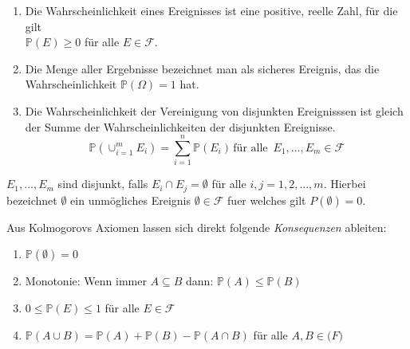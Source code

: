 \begin{Def}

\vspace{5pt}

\begin{enumerate}
	\item Die Wahrscheinlichkeit eines Ereignisses ist eine positive, reelle Zahl, f\"ur die gilt \\ $\mathbb{P} (E) \geq 0$ f\"ur alle $E \in \mathcal{F}$.
	\item Die Menge aller Ergebnisse bezeichnet man als sicheres Ereignis, das die Wahrscheinlichkeit $\mathbb{P} (\Omega) = 1$ hat.
	\item Die Wahrscheinlichkeit der Vereinigung von disjunkten Ereignisssen ist gleich der Summe der Wahrscheinlichkeiten der disjunkten Ereignisse. 
	\vspace{3pt}
	\begin{equation*}
	\mathbb{P} (\cup_{i=1}^m E_{i}) = \sum_{i=1}^n \mathbb{P} (E_{i}) \, \text{f\"ur alle } \, E_{1},...,E_{m} \in \mathcal{F}
	\end{equation*}
\end{enumerate}
\vspace{5pt}

$E_{1},...,E_{m}$ sind disjunkt, falls $E_{i} \cap E_{j} = \emptyset$ f\"ur alle $i,j= 1,2,...,m$. 
Hierbei bezeichnet $\emptyset$ ein unm\"ogliches Ereignis $\emptyset \in \mathcal{F}$ fuer welches gilt $P(\emptyset) = 0$.
\end{Def}


\vspace{10pt}

Aus Kolmogorovs Axiomen lassen sich direkt folgende \textit{Konsequenzen} ableiten:


\vspace{5pt}

\begin{enumerate}
	\item $\mathbb{P} (\emptyset) = 0$
	\item Monotonie: Wenn immer $A\subseteq B$ dann: $\mathbb{P} (A) \leq \mathbb{P} (B)$
	\item $0 \leq \mathbb{P} (E) \leq 1$   f\"ur alle $E \in \mathcal{F}$
	\item $ \mathbb{P} (A \cup B) = \mathbb{P} (A) + \mathbb{P} (B) - \mathbb{P} (A \cap B)$ f\"ur alle $A,B \in \mathcal(F)$
\end{enumerate}


\vspace{10pt}

